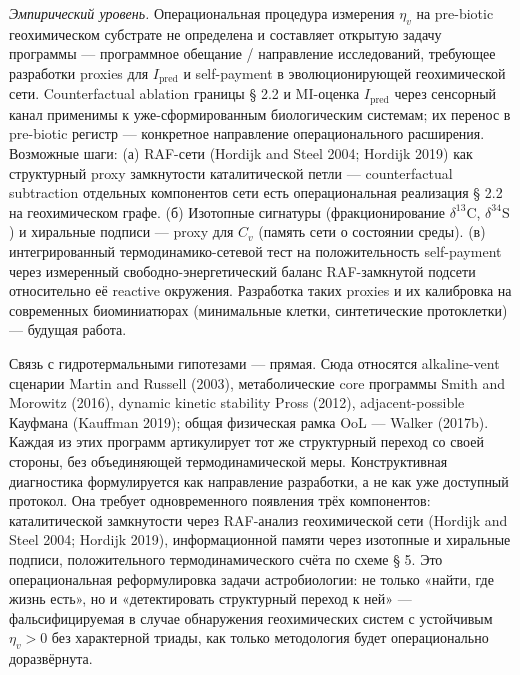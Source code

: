 \documentclass[pdflatex,sn-mathphys-ay]{sn-jnl}
\begin{document}
\emph{Эмпирический уровень.} Операциональная процедура измерения \(\eta_v\) на pre-biotic геохимическом субстрате не определена и составляет открытую задачу программы --- программное обещание / направление исследований, требующее разработки proxies для \(I_{\text{pred}}\) и self-payment в эволюционирующей геохимической сети. Counterfactual ablation границы § 2.2 и MI-оценка \(I_{\text{pred}}\) через сенсорный канал применимы к уже-сформированным биологическим системам; их перенос в pre-biotic регистр --- конкретное направление операционального расширения. Возможные шаги: (а) RAF-сети (Hordijk and Steel 2004; Hordijk 2019) как структурный proxy замкнутости каталитической петли --- counterfactual subtraction отдельных компонентов сети есть операциональная реализация § 2.2 на геохимическом графе. (б) Изотопные сигнатуры (фракционирование \(\delta^{13}\mathrm{C}\), \(\delta^{34}\mathrm{S}\)) и хиральные подписи --- proxy для \(C_v\) (память сети о состоянии среды). (в) интегрированный термодинамико-сетевой тест на положительность self-payment через измеренный свободно-энергетический баланс RAF-замкнутой подсети относительно её reactive окружения. Разработка таких proxies и их калибровка на современных биоминиатюрах (минимальные клетки, синтетические протоклетки) --- будущая работа.

Связь с гидротермальными гипотезами --- прямая. Сюда относятся alkaline-vent сценарии Martin and Russell (2003), метаболические core программы Smith and Morowitz (2016), dynamic kinetic stability Pross (2012), adjacent-possible Кауфмана (Kauffman 2019); общая физическая рамка OoL --- Walker (2017b). Каждая из этих программ артикулирует тот же структурный переход со своей стороны, без объединяющей термодинамической меры. Конструктивная диагностика формулируется как направление разработки, а не как уже доступный протокол. Она требует одновременного появления трёх компонентов: каталитической замкнутости через RAF-анализ геохимической сети (Hordijk and Steel 2004; Hordijk 2019), информационной памяти через изотопные и хиральные подписи, положительного термодинамического счёта по схеме § 5. Это операциональная реформулировка задачи астробиологии: не только «найти, где жизнь есть», но и «детектировать структурный переход к ней» --- фальсифицируемая в случае обнаружения геохимических систем с устойчивым \(\eta_v > 0\) без характерной триады, как только методология будет операционально доразвёрнута.
\end{document}
